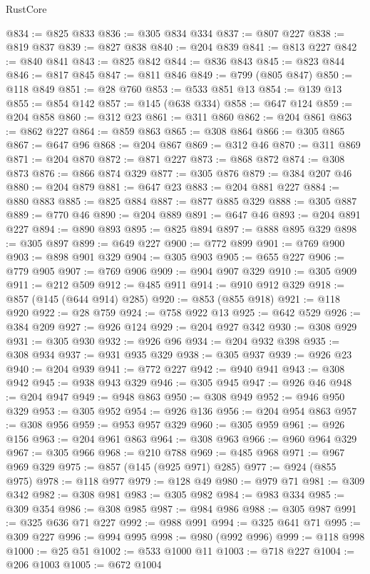 \begin{lexlean}{RustCore}
\begin{coremodule}
@834 := @825 @833
@836 := @305 @834 @334
@837 := @807 @227
@838 := @819 @837
@839 := @827 @838
@840 := @204 @839
@841 := @813 @227
@842 := @840 @841
@843 := @825 @842
@844 := @836 @843
@845 := @823 @844
@846 := @817 @845
@847 := @811 @846
@849 := @799 (@805 @847)
@850 := @118 @849
@851 := @28 @760
@853 := @533 @851 @13
@854 := @139 @13
@855 := @854 @142
@857 := @145 (@638 @334)
@858 := @647 @124
@859 := @204 @858
@860 := @312 @23
@861 := @311 @860
@862 := @204 @861
@863 := @862 @227
@864 := @859 @863
@865 := @308 @864
@866 := @305 @865
@867 := @647 @96
@868 := @204 @867
@869 := @312 @46
@870 := @311 @869
@871 := @204 @870
@872 := @871 @227
@873 := @868 @872
@874 := @308 @873
@876 := @866 @874 @329
@877 := @305 @876
@879 := @384 @207 @46
@880 := @204 @879
@881 := @647 @23
@883 := @204 @881 @227
@884 := @880 @883
@885 := @825 @884
@887 := @877 @885 @329
@888 := @305 @887
@889 := @770 @46
@890 := @204 @889
@891 := @647 @46
@893 := @204 @891 @227
@894 := @890 @893
@895 := @825 @894
@897 := @888 @895 @329
@898 := @305 @897
@899 := @649 @227
@900 := @772 @899
@901 := @769 @900
@903 := @898 @901 @329
@904 := @305 @903
@905 := @655 @227
@906 := @779 @905
@907 := @769 @906
@909 := @904 @907 @329
@910 := @305 @909
@911 := @212 @509
@912 := @485 @911
@914 := @910 @912 @329
@918 := @857 (@145 (@644 @914) @285)
@920 := @853 (@855 @918)
@921 := @118 @920
@922 := @28 @759
@924 := @758 @922 @13
@925 := @642 @529
@926 := @384 @209
@927 := @926 @124
@929 := @204 @927 @342
@930 := @308 @929
@931 := @305 @930
@932 := @926 @96
@934 := @204 @932 @398
@935 := @308 @934
@937 := @931 @935 @329
@938 := @305 @937
@939 := @926 @23
@940 := @204 @939
@941 := @772 @227
@942 := @940 @941
@943 := @308 @942
@945 := @938 @943 @329
@946 := @305 @945
@947 := @926 @46
@948 := @204 @947
@949 := @948 @863
@950 := @308 @949
@952 := @946 @950 @329
@953 := @305 @952
@954 := @926 @136
@956 := @204 @954 @863
@957 := @308 @956
@959 := @953 @957 @329
@960 := @305 @959
@961 := @926 @156
@963 := @204 @961 @863
@964 := @308 @963
@966 := @960 @964 @329
@967 := @305 @966
@968 := @210 @788
@969 := @485 @968
@971 := @967 @969 @329
@975 := @857 (@145 (@925 @971) @285)
@977 := @924 (@855 @975)
@978 := @118 @977
@979 := @128 @49
@980 := @979 @71
@981 := @309 @342
@982 := @308 @981
@983 := @305 @982
@984 := @983 @334
@985 := @309 @354
@986 := @308 @985
@987 := @984 @986
@988 := @305 @987
@991 := @325 @636 @71 @227
@992 := @988 @991
@994 := @325 @641 @71
@995 := @309 @227
@996 := @994 @995
@998 := @980 (@992 @996)
@999 := @118 @998
@1000 := @25 @51
@1002 := @533 @1000 @11
@1003 := @718 @227
@1004 := @206 @1003
@1005 := @672 @1004

\end{coremodule}
\end{lexlean}
